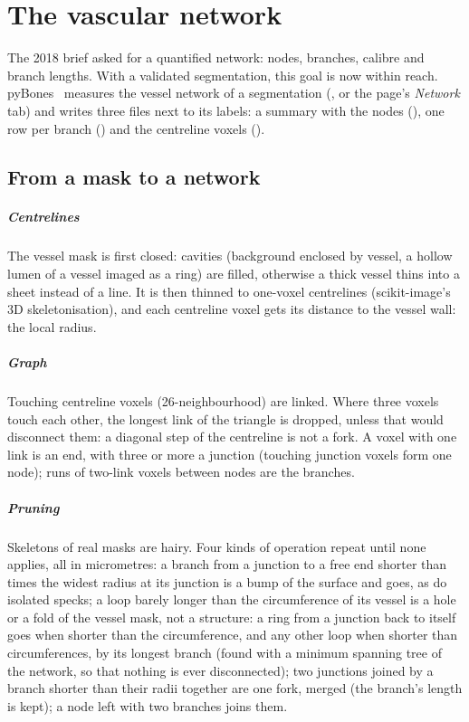 \chapter{The vascular network}
\label{chap:network}

The 2018 brief asked for a quantified network: nodes, branches, calibre and branch lengths. With a
validated segmentation, this goal is now within reach. pyBones~\pbValueVersion{} measures the vessel
network of a segmentation (, or the page's \emph{Network} tab) and writes
three files next to its labels: a summary with the nodes (), one row per branch
() and the centreline voxels ().

\section{From a mask to a network}

\paragraph{Centrelines} The vessel mask is first closed: cavities (background enclosed by vessel, a
hollow lumen of a vessel imaged as a ring) are filled, otherwise a thick vessel thins into a sheet
instead of a line. It is then thinned to one-voxel centrelines (scikit-image's 3D skeletonisation),
and each centreline voxel gets its distance to the vessel wall: the local radius.

\paragraph{Graph} Touching centreline voxels (26-neighbourhood) are linked. Where three voxels touch
each other, the longest link of the triangle is dropped, unless that would disconnect them: a
diagonal step of the centreline is not a fork. A voxel with one link is an end, with three or more a
junction (touching junction voxels form one node); runs of two-link voxels between nodes are the
branches.

\paragraph{Pruning} Skeletons of real masks are hairy. Four kinds of operation repeat until none applies,
all in micrometres: a branch from a junction to a free end shorter than \pbValueNetSpurFactor{} times the widest radius at its
junction is a bump of the surface and goes, as do isolated specks; a loop barely longer than the
circumference of its vessel is a hole or a fold of the vessel mask, not a structure: a ring from a
junction back to itself goes when shorter than the circumference, and any other loop when shorter than
\pbValueNetLoopFactor{} circumferences, by its longest branch (found with a minimum spanning tree of
the network, so that nothing is ever disconnected); two junctions joined by a branch shorter than
their radii together are one fork, merged (the branch's length is kept); a node left with two branches
joins them.

